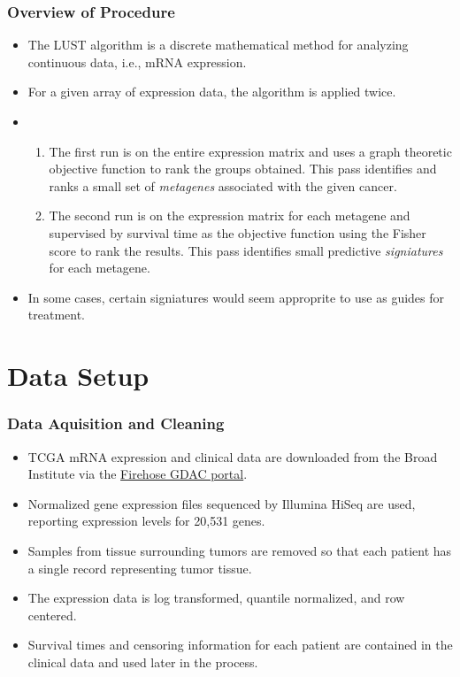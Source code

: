 \documentclass[
	11pt, %
]{beamer}
\begin{document}
\begin{frame}
	\frametitle{Overview of Procedure}
	
	\begin{itemize}
        \item The LUST algorithm is a discrete mathematical method for analyzing continuous data, i.e., mRNA expression.
        \item For a given array of expression data, the algorithm is applied twice.
        \item 
        \begin{enumerate}
            \item The first run is on the entire expression matrix and uses a graph theoretic objective function to rank the groups obtained. This pass identifies and ranks a small set of \emph{metagenes} associated with the given cancer.
            \item The second run is on the expression matrix for each metagene and supervised by survival time as the objective function using the Fisher score to rank the results. This pass identifies small predictive \emph{signiatures} for each metagene.
        \end{enumerate}
        \item In some cases, certain signiatures would seem approprite to use as guides for treatment.
    \end{itemize}
\end{frame}


\section{Data Setup}

\begin{frame}
	\frametitle{Data Aquisition and Cleaning}
	
	\begin{itemize}
        \item TCGA mRNA expression and clinical data are downloaded from the Broad Institute via the \href{https://gdac.broadinstitute.org/}{Firehose GDAC portal}.
        \item Normalized gene expression files sequenced by Illumina HiSeq are used, reporting expression levels for 20,531 genes.
        \item Samples from tissue surrounding tumors are removed so that each patient has a single record representing tumor tissue.
        \item The expression data is log transformed, quantile normalized, and row centered.
        \item Survival times and censoring information for each patient are contained in the clinical data and used later in the process.
    \end{itemize}
\end{frame}
\end{document}
